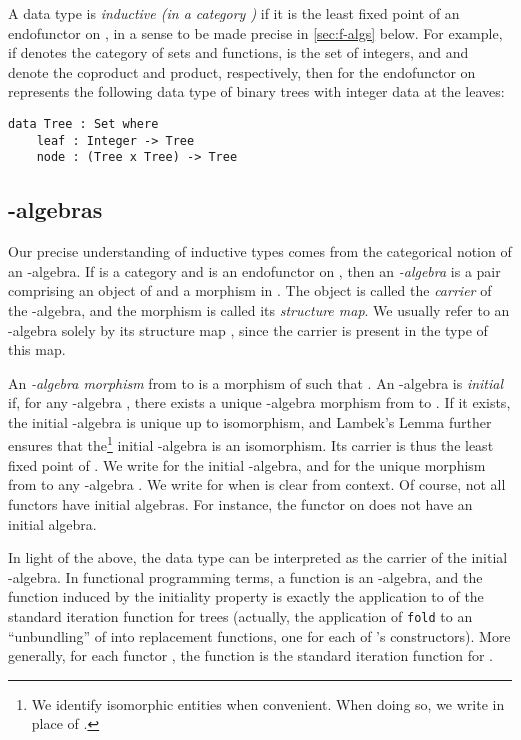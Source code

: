 \documentclass{LMCS}
\begin{document}
A data type is {\em inductive (in a category )} if it is the
least fixed point  of an endofunctor  on , in a
sense to be made precise in \autoref{sec:f-algs} below. For example,
if  denotes the category of sets and functions,  is
the set of integers, and  and  denote the coproduct and
product, respectively, then  for the
endofunctor  on 
represents the following data type of binary trees with integer data
at the leaves:
\begin{verbatim}
data Tree : Set where
    leaf : Integer -> Tree
    node : (Tree x Tree) -> Tree
\end{verbatim}

\subsection{-algebras}\label{sec:f-algs}

Our precise understanding of inductive types comes from the
categorical notion of an -algebra. If  is a category and
 is an endofunctor on , then an \emph{-algebra} is a
pair  comprising an object  of 
and a morphism  in . The object  is
called the \emph{carrier} of the -algebra, and the morphism
 is called its \emph{structure map}. We usually refer to an
-algebra solely by its structure map , since the
carrier is present in the type of this map.

An \emph{-algebra morphism} from  to  is a morphism  of  such that . An -algebra  is
\emph{initial} if, for any -algebra , there
exists a unique -algebra morphism from  to . If it
exists, the initial -algebra is unique up to isomorphism, and
Lambek's Lemma further ensures that the\footnote{We identify
  isomorphic entities when convenient. When doing so, we write  in
  place of .}  initial -algebra is an isomorphism. Its
carrier is thus the least fixed point  of . We write  for the initial -algebra, and
 for the unique morphism from  to any -algebra . We write
 for  when  is clear from context.  Of
course, not all functors have initial algebras. For instance, the
functor  on  does not have an initial
algebra.

In light of the above, the data type  can be
interpreted as the carrier of the initial
-algebra. In functional programming terms, a
function  is an
-algebra, and the function  induced by the initiality property is exactly the
application to  of the standard iteration function
 for trees (actually, the application of \verb|fold| to
an ``unbundling'' of  into replacement functions, one for each
of 's constructors). More generally, for each
functor , the function 
is the standard iteration function for .
\end{document}
